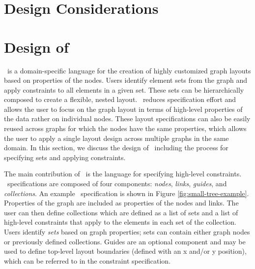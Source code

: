 \section{Design Considerations}


\section{Design of \projectname}
\projectname\ is a domain-specific language for the creation of highly
customized graph layouts based on properties of the nodes. Users identify
element sets from the graph and apply constraints to all elements in a
given set. These sets can be hierarchically composed to create a flexible,
nested layout. \projectname\ reduces specification effort and allows the
user to focus on the graph layout in terms of high-level properties of the
data rather on individual nodes. These layout specifications can also be
easily reused across graphs for which the nodes have the same properties,
which allows the user to apply a single layout design across multiple
graphs in the same domain. In this section, we discuss the design of
\projectname\ including the process for specifying sets and applying
constraints.

\smallTreeExample

The main contribution of \projectname\ is the language for specifying
high-level constraints. \projectname\ specifications are composed of four
components: \emph{nodes}, \emph{links}, \emph{guides}, and
\emph{collections}. An example \projectname\ specification is shown in
Figure \ref{fig:small-tree-example}. Properties of the graph are included
as properties of the nodes and links. The user can then define collections
which are defined as a list of sets and a list of high-level constraints
that apply to the elements in each set of the collection. Users identify
\emph{sets} based on graph properties; sets can contain either graph nodes
or previously defined collections. Guides are an optional component and may
be used to define top-level layout boundaries (defined with an x and/or y
position), which can be referred to in the constraint specification.

